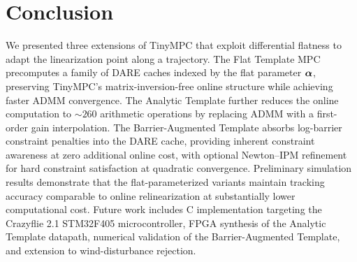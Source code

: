 \section{Conclusion}\label{sec:conclusion}

We presented three extensions of TinyMPC that exploit differential
flatness to adapt the linearization point along a trajectory.
The Flat Template MPC precomputes a family of DARE caches indexed
by the flat parameter $\bm{\alpha}$, preserving TinyMPC's
matrix-inversion-free online structure while achieving
faster ADMM convergence.
The Analytic Template further reduces the online computation
to ${\sim}260$ arithmetic operations by replacing ADMM
with a first-order gain interpolation.
The Barrier-Augmented Template absorbs log-barrier constraint
penalties into the DARE cache, providing inherent constraint
awareness at zero additional online cost, with optional
Newton--IPM refinement for hard constraint satisfaction
at quadratic convergence.
Preliminary simulation results demonstrate that
the flat-parameterized variants
maintain tracking accuracy comparable to online relinearization
at substantially lower computational cost.
Future work includes C implementation targeting the
Crazyflie 2.1 STM32F405 microcontroller,
FPGA synthesis of the Analytic Template datapath,
numerical validation of the Barrier-Augmented Template,
and extension to wind-disturbance rejection.
